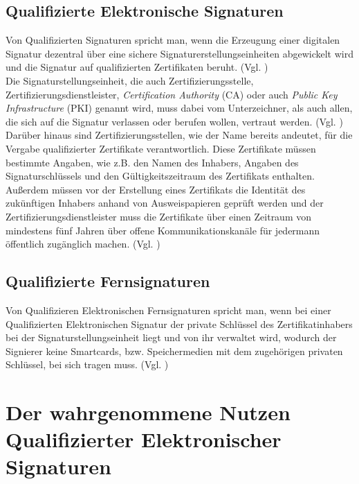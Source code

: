 \documentclass[deutsch]{lib/llncs/llncs}
\begin{document}
\subsection{Qualifizierte Elektronische Signaturen}
Von Qualifizierten Signaturen spricht man, wenn die Erzeugung einer digitalen Signatur dezentral über eine sichere Signaturerstellungseinheiten abgewickelt wird und die Signatur auf qualifizierten Zertifikaten beruht. (Vgl. \cite[S. 8]{Zitat07}) \\
Die Signaturstellungseinheit, die auch Zertifizierungsstelle, Zertifizierungsdienstleister, \textit{Certification Authority} (CA) oder auch \textit{Public Key Infrastructure} (PKI) genannt wird, muss dabei vom Unterzeichner, als auch allen, die sich auf die Signatur verlassen oder berufen wollen, vertraut werden. (Vgl. \cite[S. 9]{Zitat07}) \\
Darüber hinaus sind Zertifizierungsstellen, wie der Name bereits andeutet, für die Vergabe qualifizierter Zertifikate verantwortlich. 
Diese Zertifikate müssen bestimmte Angaben, wie z.B. den Namen des Inhabers, Angaben des Signaturschlüssels und den Gültigkeitszeitraum des Zertifikats enthalten. Außerdem müssen vor der Erstellung eines Zertifikats die Identität des zukünftigen Inhabers anhand von Ausweispapieren geprüft werden und der Zertifizierungsdienstleister muss die Zertifikate über einen Zeitraum von mindestens fünf Jahren über offene Kommunikationskanäle für jedermann öffentlich zugänglich machen. (Vgl. \cite[S. 9]{Zitat07}) 


\subsection{Qualifizierte Fernsignaturen}
Von Qualifizieren Elektronischen Fernsignaturen spricht man, wenn bei einer Qualifizierten Elektronischen Signatur der private Schlüssel des Zertifikatinhabers bei der Signaturstellungseinheit liegt und von ihr verwaltet wird, wodurch der Signierer keine Smartcards, bzw. Speichermedien mit dem zugehörigen privaten Schlüssel, bei sich tragen muss. (Vgl. \cite[S. 30]{Zitat08})


\section{Der wahrgenommene Nutzen Qualifizierter Elektronischer Signaturen}
\end{document}
